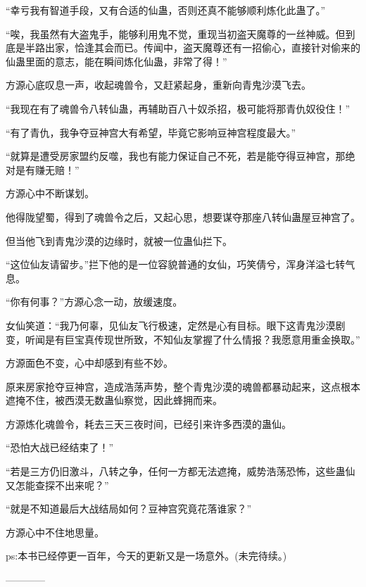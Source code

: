 \begin{this_body}
“幸亏我有智道手段，又有合适的仙蛊，否则还真不能够顺利炼化此蛊了。”

“唉，我虽然有大盗鬼手，能够利用鬼不觉，重现当初盗天魔尊的一丝神威。但到底是半路出家，恰逢其会而已。传闻中，盗天魔尊还有一招偷心，直接针对偷来的仙蛊里面的意志，能在瞬间炼化仙蛊，非常了得！”

方源心底叹息一声，收起魂兽令，又赶紧起身，重新向青鬼沙漠飞去。

“我现在有了魂兽令八转仙蛊，再辅助百八十奴杀招，极可能将那青仇奴役住！”

“有了青仇，我争夺豆神宫大有希望，毕竟它影响豆神宫程度最大。”

“就算是遭受房家盟约反噬，我也有能力保证自己不死，若是能夺得豆神宫，那绝对是有赚无赔！”

方源心中不断谋划。

他得陇望蜀，得到了魂兽令之后，又起心思，想要谋夺那座八转仙蛊屋豆神宫了。

但当他飞到青鬼沙漠的边缘时，就被一位蛊仙拦下。

“这位仙友请留步。”拦下他的是一位容貌普通的女仙，巧笑倩兮，浑身洋溢七转气息。

“你有何事？”方源心念一动，放缓速度。

女仙笑道：“我乃何辜，见仙友飞行极速，定然是心有目标。眼下这青鬼沙漠剧变，听闻是有巨宝真传现世所致，不知仙友掌握了什么情报？我愿意用重金换取。”

方源面色不变，心中却感到有些不妙。

原来房家抢夺豆神宫，造成浩荡声势，整个青鬼沙漠的魂兽都暴动起来，这点根本遮掩不住，被西漠无数蛊仙察觉，因此蜂拥而来。

方源炼化魂兽令，耗去三天三夜时间，已经引来许多西漠的蛊仙。

“恐怕大战已经结束了！”

“若是三方仍旧激斗，八转之争，任何一方都无法遮掩，威势浩荡恐怖，这些蛊仙又怎能查探不出来呢？”

“就是不知道最后大战结局如何？豆神宫究竟花落谁家？”

方源心中不住地思量。

ps:本书已经停更一百年，今天的更新又是一场意外。(未完待续。)

------------

\end{this_body}

